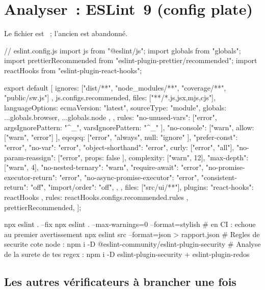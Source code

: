 \section{Analyser~: ESLint~9 (config plate)}

Le fichier est ~; l'ancien  est abandonn\'e.

\begin{codejs}
// eslint.config.js
import js from "@eslint/js";
import globals from "globals";
import prettierRecommended from "eslint-plugin-prettier/recommended";
import reactHooks from "eslint-plugin-react-hooks";

export default [
  { ignores: ["dist/**", "node_modules/**", "coverage/**", "public/sw.js"] },
  js.configs.recommended,
  {
    files: ["**/*.{js,jsx,mjs,cjs}"],
    languageOptions: {
      ecmaVersion: "latest",
      sourceType: "module",
      globals: { ...globals.browser, ...globals.node },
    },
    rules: {
      "no-unused-vars": ["error", { argsIgnorePattern: "^_", varsIgnorePattern: "^_" }],
      "no-console": ["warn", { allow: ["warn", "error"] }],
      eqeqeq: ["error", "always", { null: "ignore" }],
      "prefer-const": "error",
      "no-var": "error",
      "object-shorthand": "error",
      curly: ["error", "all"],
      "no-param-reassign": ["error", { props: false }],
      complexity: ["warn", 12],
      "max-depth": ["warn", 4],
      "no-nested-ternary": "warn",
      "require-await": "error",
      "no-promise-executor-return": "error",
      "no-async-promise-executor": "error",
      "consistent-return": "off",
      "import/order": "off",
    },
  },
  { files: ["src/ui/**"], plugins: { "react-hooks": reactHooks }, rules: reactHooks.configs.recommended.rules },
  prettierRecommended,
];
\end{codejs}

\begin{terminal}
npx eslint . --fix
npx eslint . --max-warnings=0 --format=stylish        # en CI : echoue au premier avertissement
npx eslint src --format=json > rapport.json
# Regles de securite cote node : npm i -D @eslint-community/eslint-plugin-security
# Analyse de la surete de tes regex : npm i -D eslint-plugin-security + eslint-plugin-redos
\end{terminal}

\subsection{Les autres v\'erificateurs \`a brancher une fois}

